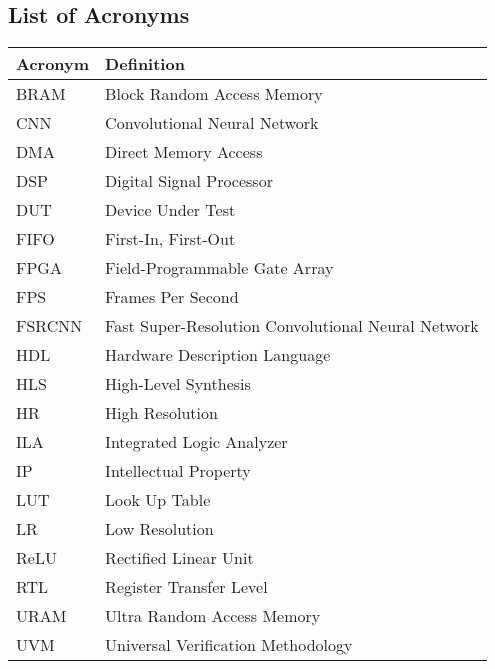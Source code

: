 \documentclass{article}
\begin{document}
\newpage %
\begin{appendices}

\section{List of Acronyms}
\label{appendix:appendix_a}

    \begin{table}[h]
    \centering
    \label{tab:glossary}
    \begin{tabular}{|l|l|}
    \hline
    \textbf{Acronym} & \textbf{Definition} \\
    \hline
    BRAM   & Block Random Access Memory \\
    CNN    & Convolutional Neural Network \\
    DMA    & Direct Memory Access \\
    DSP    & Digital Signal Processor \\
    DUT    & Device Under Test \\
    FIFO   & First-In, First-Out \\
    FPGA   & Field-Programmable Gate Array \\
    FPS    & Frames Per Second \\
    FSRCNN & Fast Super-Resolution Convolutional Neural Network \\
    HDL    & Hardware Description Language \\
    HLS    & High-Level Synthesis \\
    HR     & High Resolution \\
    ILA    & Integrated Logic Analyzer \\
    IP     & Intellectual Property \\
    LUT    & Look Up Table \\
    LR     & Low Resolution \\
    ReLU   & Rectified Linear Unit \\
    RTL    & Register Transfer Level \\
    URAM   & Ultra Random Access Memory \\
    UVM    & Universal Verification Methodology \\
    \hline
    \end{tabular}
    \end{table}


\end{appendices}

\newpage %

\end{document}
